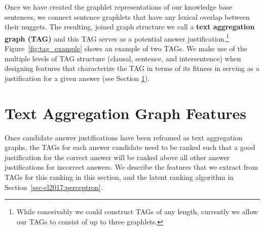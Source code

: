 Once we have created the graphlet representations of our knowledge base sentences, we connect sentence graphlets that have any lexical overlap between their nuggets.  The resulting, joined graph structure we call a \textbf{text aggregation graph (TAG)} and this TAG serves as a potential answer justification.\footnote{While conceivably we could construct TAGs of any length, currently we allow our TAGs to consist of up to three graphlets.}
Figure~\ref{fig:tag_example} shows an example of two TAGs. 
We make use of the multiple levels of TAG structure (clausal, sentence, and intersentence) when designing features that characterize the TAG in terms of its fitness in serving as a justification for a given answer (see Section \ref{sec-cl2017:scoring}).




\section{Text Aggregation Graph Features}
\label{sec-cl2017:scoring}

Once candidate answer justifications have been reframed as text aggregation graphs, the TAGs for each answer candidate need to be ranked such that a good justification for the correct answer will be ranked above all other answer justifications for incorrect answers. We describe the features that we extract from TAGs for this ranking in this section, and the latent ranking algorithm in Section~\ref{sec-cl2017:perceptron}.




